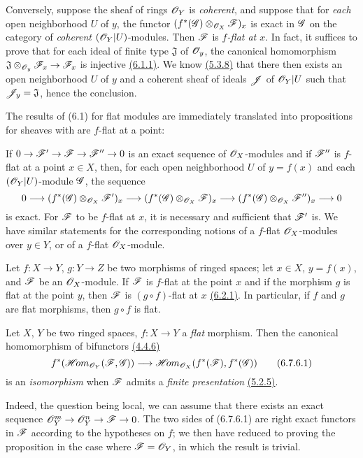 \begin{env}[6.7.3]
\label{env-0.6.7.3}
Conversely, suppose the sheaf of rings $\mathscr{O}_Y$ is {\em coherent}, and suppose that for
{\em each} open neighborhood $U$ of $y$, the functor $(f^*(\mathscr{G})\otimes_{\mathscr{O}_X}\mathscr{F})_x$
is exact in $\mathscr{G}$ on the category of {\em coherent} $(\mathscr{O}_Y|U)$-modules. Then $\mathscr{F}$ is
{\em $f$-flat at $x$}. In fact, it suffices to prove that for each ideal of finite type
$\mathfrak{J}$ of $\mathscr{O}_y$, the canonical homomorphism
$\mathfrak{J}\otimes_{\mathscr{O}_y}\mathscr{F}_x\to\mathscr{F}_x$ is injective \hyperref[env-0.6.1.1]{(6.1.1)}. We know
\hyperref[env-0.5.3.8]{(5.3.8)} that there then exists an open neighborhood
$U$ of $y$ and a coherent sheaf of ideals $\mathscr{J}$ of $\mathscr{O}_Y|U$ such that
$\mathscr{J}_y=\mathfrak{J}$, hence the conclusion.
\end{env}

\begin{env}[6.7.4]
\label{env-0.6.7.4}
The results of (6.1) for flat modules are immediately translated into propositions for
sheaves with are $f$-flat at a point:

If $0\to\mathscr{F}'\to\mathscr{F}\to\mathscr{F}''\to 0$ is an exact sequence of $\mathscr{O}_X$-modules and if
$\mathscr{F}''$ is $f$-flat at a point $x\in X$, then, for each open neighborhood $U$ of $y=f(x)$
and each $(\mathscr{O}_Y|U)$-module $\mathscr{G}$, the sequence
\[
  0\longrightarrow(f^*(\mathscr{G})\otimes_{\mathscr{O}_X}\mathscr{F}')_x
  \longrightarrow(f^*(\mathscr{G})\otimes_{\mathscr{O}_X}\mathscr{F})_x
  \longrightarrow(f^*(\mathscr{G})\otimes_{\mathscr{O}_X}\mathscr{F}'')_x\longrightarrow 0
\]
is exact. For $\mathscr{F}$ to be $f$-flat at $x$, it is necessary and sufficient that $\mathscr{F}'$
is. We have similar statements for the corresponding notions of a $f$-flat $\mathscr{O}_X$-modules
over $y\in Y$, or of a $f$-flat $\mathscr{O}_X$-module.
\end{env}

\begin{env}[6.7.5]
\label{env-0.6.7.5}
Let $f:X\to Y$, $g:Y\to Z$ be two morphisms of ringed spaces; let $x\in X$, $y=f(x)$, and
$\mathscr{F}$ be an $\mathscr{O}_X$-module. If $\mathscr{F}$ is $f$-flat at the point $x$ and if the morphism
$g$ is flat at the point $y$, then $\mathscr{F}$ is $(g\circ f)$-flat at $x$ \hyperref[env-0.6.2.1]{(6.2.1)}. In
particular, if $f$ and $g$ are flat morphisms, then $g\circ f$ is flat.
\end{env}

\begin{env}[6.7.6]
\label{env-0.6.7.6}
Let $X$, $Y$ be two ringed spaces, $f:X\to Y$ a {\em flat} morphism. Then the canonical
homomorphism of bifunctors \hyperref[env-0.4.4.6]{(4.4.6)}
\[
  f^*(\mathscr{H}\!{om}_{\mathscr{O}_Y}(\mathscr{F},\mathscr{G}))\longrightarrow\mathscr{H}\!{om}_{\mathscr{O}_X}(f^*(\mathscr{F}),f^*(\mathscr{G}))
  \tag{6.7.6.1}
\]
is an {\em isomorphism} when $\mathscr{F}$ admits a {\em finite presentation} \hyperref[env-0.5.2.5]{(5.2.5)}.

Indeed, the question being local, we can assume that there exists an exact sequence
$\mathscr{O}_Y^m\to\mathscr{O}_Y^n\to\mathscr{F}\to 0$. The two sides of (6.7.6.1) are right exact functors in
$\mathscr{F}$ according to the hypotheses on $f$; we then have reduced to proving the proposition
in the case where $\mathscr{F}=\mathscr{O}_Y$, in which the result is trivial.
\end{env}

